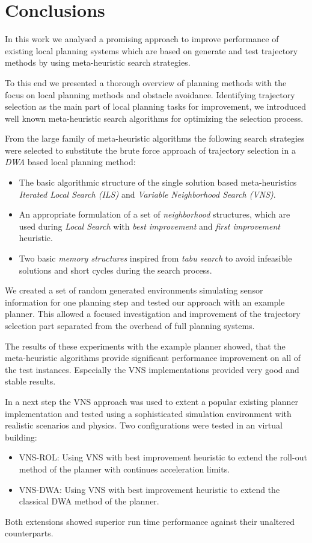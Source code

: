 \chapter{Conclusions}\label{ch:conc}
In this work we analysed a promising approach to improve performance of existing local planning systems which are based on generate and test trajectory methods by using meta-heuristic search strategies.

To this end we presented a thorough overview of planning methods with the focus on local planning methods and obstacle avoidance. 
Identifying trajectory selection as the main part of local planning tasks for improvement, we introduced well known meta-heuristic search algorithms for optimizing the selection process.

From the large family of meta-heuristic algorithms the following search strategies were selected to substitute the brute force approach of trajectory selection in a \emph{DWA} based local planning method:
\begin{itemize}
\item The basic algorithmic structure of the single solution based meta-heuristics \emph{Iterated Local Search (ILS)} and \emph{Variable Neighborhood Search (VNS)}.
\item An appropriate formulation of a set of \emph{neighborhood} structures, which are used during \emph{Local Search}  with \emph{best improvement} and \emph{first improvement} heuristic.
\item Two basic \emph{memory structures} inspired from \emph{tabu search} to avoid infeasible solutions and short cycles during the search process. 
\end{itemize}

We created a set of random generated environments simulating sensor information for one planning step and tested our approach with an example planner. 
This allowed a focused investigation and improvement of the trajectory selection part separated from the overhead of full planning systems.

The results of these experiments with the example planner showed, that the meta-heuristic algorithms provide significant performance improvement on all of the test instances. Especially the VNS implementations provided very good and stable results. 

In a next step the VNS approach was used to extent a popular existing planner implementation and tested using a sophisticated simulation environment with realistic scenarios and physics. Two configurations were tested in an virtual building:
\begin{itemize}
\item VNS-ROL: Using VNS with best improvement heuristic to extend the roll-out method of the planner with continues acceleration limits.
\item VNS-DWA: Using VNS with best improvement heuristic to extend the classical DWA method of the planner.
\end{itemize}
Both extensions showed superior run time performance against their unaltered counterparts.

